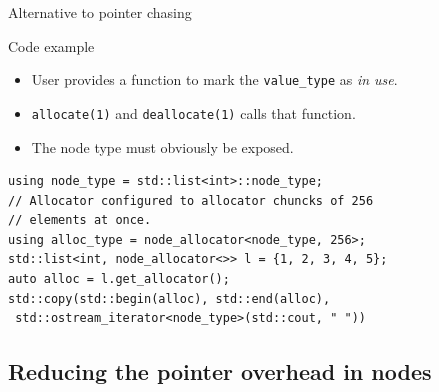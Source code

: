 \documentclass[10pt,aspectratio=169]{beamer}
\begin{document}
\begin{frame}[fragile]{Alternative to pointer chasing}
\begin{block} {Code example}
\begin{itemize}
\item User provides a function to mark the \texttt{value\_type}
as {\it in use}.
\item \texttt{allocate(1)} and \texttt{deallocate(1)} calls that 
function.
\item The node type must obviously be exposed.
\end{itemize}
\end{block}

\begin{lstlisting}
using node_type = std::list<int>::node_type;
// Allocator configured to allocator chuncks of 256
// elements at once.
using alloc_type = node_allocator<node_type, 256>;
std::list<int, node_allocator<>> l = {1, 2, 3, 4, 5};
auto alloc = l.get_allocator();
std::copy(std::begin(alloc), std::end(alloc),
 std::ostream_iterator<node_type>(std::cout, " "))
\end{lstlisting}

\end{frame}

\subsection{Reducing the pointer overhead in nodes}
\end{document}
